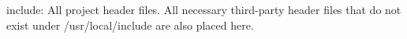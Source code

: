 include\+: All project header files. All necessary third-\/party header files that do not exist under /usr/local/include are also placed here. 